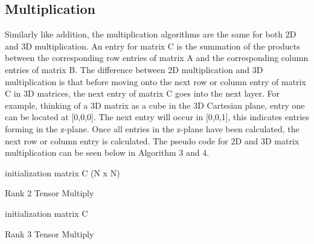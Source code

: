 \documentclass[twocolumn, 11pt]{IEEEtran}
\begin{document}
\subsection{Multiplication}

Similarly like addition, the multiplication algorithms are the same for both 2D and 3D multiplication. An entry for matrix C is the summation of the products between the corresponding row entries of matrix A and the corresponding column entries of matrix B. The difference between 2D multiplication and 3D multiplication is that before moving onto the next row or column entry of matrix C in 3D matrices, the next entry of matrix C goes into the next layer. For example, thinking of a 3D matrix as a cube in the 3D Cartesian plane, entry one can be located at [0,0,0]. The next entry will occur in [0,0,1], this indicates entries forming in the z-plane. Once all entries in the z-plane have been calculated, the next row or column entry is calculated. The pseudo code for 2D and 3D matrix multiplication can be seen below in Algorithm 3 and 4. 


\begin{algorithm}
\SetAlgoLined
     initialization matrix C (N x N)\;
     \caption{Rank 2 Tensor Multiply}
\end{algorithm}

\begin{algorithm}
\SetAlgoLined
     initialization matrix C\;
     \caption{Rank 3 Tensor Multiply}
\end{algorithm}
\end{document}
